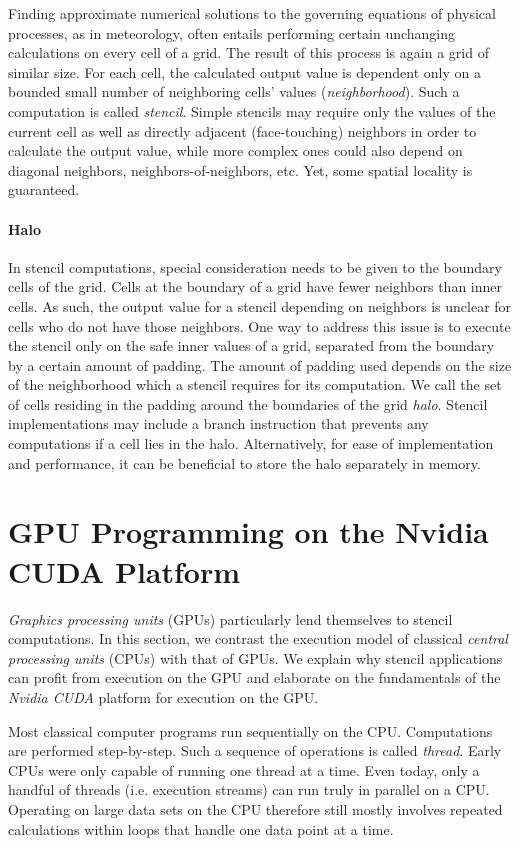 Finding approximate numerical solutions to the governing equations of physical processes, as in meteorology, often entails performing certain unchanging calculations on every cell of a grid. The result of this process is again a grid of similar size. For each cell, the calculated output value is dependent only on a bounded small number of neighboring cells' values (\emph{neighborhood}). Such a computation is called \emph{stencil}. Simple stencils may require only the values of the current cell as well as directly adjacent (face-touching) neighbors in order to calculate the output value, while more complex ones could also depend on diagonal neighbors, neighbors-of-neighbors, etc. Yet, some spatial locality is guaranteed. 

\paragraph{Halo} \label{sec:halo} In stencil computations, special consideration needs to be given to the boundary cells of the grid. Cells at the boundary of a grid have fewer neighbors than inner cells. As such, the output value for a stencil depending on neighbors is unclear for cells who do not have those neighbors. One way to address this issue is to execute the stencil only on the safe inner values of a grid, separated from the boundary by a certain amount of padding. The amount of padding used depends on the size of the neighborhood which a stencil requires for its computation. We call the set of cells residing in the padding around the boundaries of the grid \emph{halo}. Stencil implementations may include a branch instruction that prevents any computations if a cell lies in the halo. Alternatively, for ease of implementation and performance, it can be beneficial to store the halo separately in memory.

\section{GPU Programming on the Nvidia CUDA Platform}

\emph{Graphics processing units} (GPUs) particularly lend themselves to stencil computations. In this section, we contrast the execution model of classical \emph{central processing units} (CPUs) with that of GPUs. We explain why stencil applications can profit from execution on the GPU and elaborate on the fundamentals of the \emph{Nvidia CUDA} platform for execution on the GPU.

Most classical computer programs run sequentially on the CPU. Computations are performed step-by-step. Such a sequence of operations is called \emph{thread}. Early CPUs were only capable of running one thread at a time. Even today, only a handful of threads (i.e. execution streams) can run truly in parallel on a CPU. Operating on large data sets on the CPU therefore still mostly involves repeated calculations within loops that handle one data point at a time.

